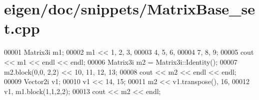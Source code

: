 \hypertarget{eigen_2doc_2snippets_2_matrix_base__set_8cpp_source}{}\section{eigen/doc/snippets/\+Matrix\+Base\+\_\+set.cpp}
\label{eigen_2doc_2snippets_2_matrix_base__set_8cpp_source}

\begin{DoxyCode}
00001 Matrix3i m1;
00002 m1 << 1, 2, 3,
00003       4, 5, 6,
00004       7, 8, 9;
00005 cout << m1 << endl << endl;
00006 Matrix3i m2 = Matrix3i::Identity();
00007 m2.block(0,0, 2,2) << 10, 11, 12, 13;
00008 cout << m2 << endl << endl;
00009 Vector2i v1;
00010 v1 << 14, 15;
00011 m2 << v1.transpose(), 16,
00012       v1, m1.block(1,1,2,2);
00013 cout << m2 << endl;
\end{DoxyCode}
